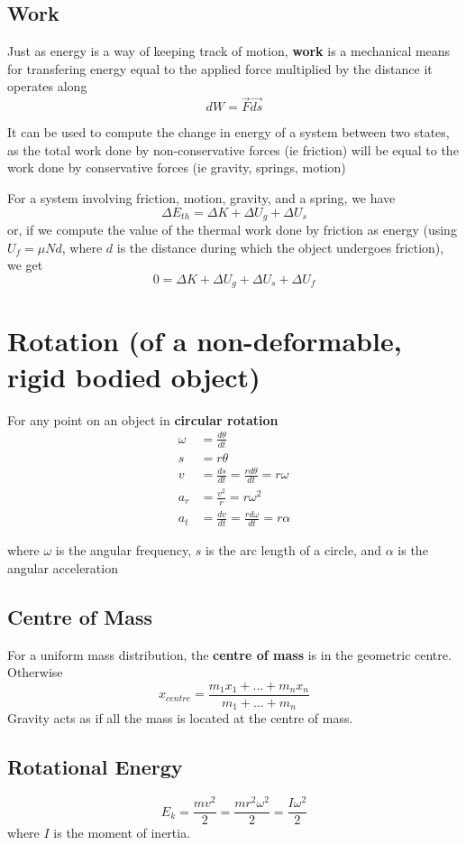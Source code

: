 \documentclass[12pt]{article}
\begin{document}
\subsection*{Work}
Just as energy is a way of keeping track of motion, {\bf work} is a mechanical means for transfering energy equal to the applied force multiplied by the distance it operates along \[ dW = \vec{F}\vec{ds} \]

It can be used to compute the change in energy of a system between two states, as the total work done by non-conservative forces (ie friction) will be equal to the work done by conservative forces (ie gravity, springs, motion)

For a system involving friction, motion, gravity, and a spring, we have \[ \Delta E_{th} = \Delta K + \Delta U_g + \Delta U_s \] or, if we compute the value of the thermal work done by friction as energy (using $U_f = \mu Nd$, where $d$ is the distance during which the object undergoes friction), we get \[ 0 = \Delta K + \Delta U_g + \Delta U_s + \Delta U_f \]

\section*{Rotation (of a non-deformable, rigid bodied object)}
For any point on an object in {\bf circular rotation}
\begin{align*}
\omega &= \frac{d\theta}{dt}\\
s &= r\theta\\
v &= \frac{ds}{dt} = \frac{rd\theta}{dt} = r\omega\\
a_r &= \frac{v^2}{r} = r\omega^2\\
a_t &= \frac{dv}{dt} = \frac{rd\omega}{dt} = r\alpha
\end{align*}

where $\omega$ is the angular frequency, $s$ is the arc length of a circle, and $\alpha$ is the angular acceleration

\subsection*{Centre of Mass}
For a uniform mass distribution, the {\bf centre of mass} is in the geometric centre. Otherwise \[ x_{centre} = \frac{m_1x_1 + ... + m_nx_n}{m_1 + ... + m_n} \] Gravity acts as if all the mass is located at the centre of mass.

\subsection*{Rotational Energy}
\[ E_k = \frac{mv^2}{2} = \frac{mr^2\omega^2}{2} = \frac{I\omega^2}{2} \] where $I$ is the moment of inertia.
\end{document}
